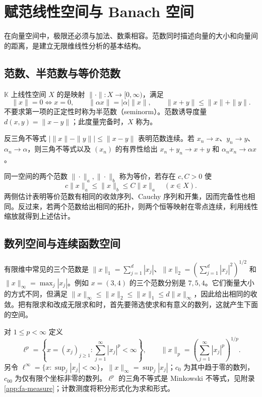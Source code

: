 \documentclass[UTF8,12pt,a4paper,fontset=fandol]{ctexbook}
\begin{document}
\chapter{赋范线性空间与 Banach 空间}
\label{chap:fa-banach}

在向量空间中，极限还必须与加法、数乘相容。范数同时描述向量的大小和向量间的距离，是建立无限维线性分析的基本结构。

\section{范数、半范数与等价范数}
\begin{definition}
$\mathbb K$ 上线性空间 $X$ 的是映射 $\|\cdot\|:X\to[0,\infty)$，满足
\[
 \|x\|=0\iff x=0,\qquad \|\alpha x\|=|\alpha|\|x\|,\qquad
 \|x+y\|\leq\|x\|+\|y\|.
\]
不要求第一项的正定性时称为半范数（seminorm）。范数诱导度量 $d(x,y)=\|x-y\|$；此度量完备时，$X$ 称为。
\end{definition}
反三角不等式 $|\|x\|-\|y\||\leq\|x-y\|$ 表明范数连续。若 $x_n\to x$、$y_n\to y$、$\alpha_n\to\alpha$，则三角不等式以及 $(x_n)$ 的有界性给出 $x_n+y_n\to x+y$ 和 $\alpha_nx_n\to\alpha x$。

同一空间的两个范数 $\|\cdot\|_a,\|\cdot\|_b$ 称为等价，若存在 $c,C>0$ 使
\[
 c\|x\|_a\leq\|x\|_b\leq C\|x\|_a\quad(x\in X).
\]
两侧估计表明等价范数有相同的收敛序列、Cauchy 序列和开集，因而完备性也相同。反过来，若两个范数给出相同的拓扑，则两个恒等映射在零点连续，利用线性缩放就得到上述估计。

\section{数列空间与连续函数空间}
有限维中常见的三个范数是 $\|x\|_1=\sum_{j=1}^d|x_j|$、$\|x\|_2=(\sum_{j=1}^d|x_j|^2)^{1/2}$ 和 $\|x\|_\infty=\max_j|x_j|$。例如 $x=(3,4)$ 的三个范数分别是 $7,5,4$。它们衡量大小的方式不同，但满足 $\|x\|_\infty\leq\|x\|_2\leq\|x\|_1\leq d\|x\|_\infty$，因此给出相同的收敛。把有限求和改成无限求和时，首先要筛选使求和有意义的数列，这就产生下面的空间。

对 $1\leq p<\infty$ 定义
\[
 \ell^p=\left\{x=(x_j)_{j\geq1}:\sum_{j=1}^\infty|x_j|^p<\infty\right\},
 \qquad \|x\|_p=\left(\sum_{j=1}^\infty|x_j|^p\right)^{1/p}.
\]
另令 $\ell^\infty=\{x:\sup_j|x_j|<\infty\}$，$\|x\|_\infty=\sup_j|x_j|$；$c_0$ 为其中趋于零的数列，$c_{00}$ 为仅有限个坐标非零的数列。$\ell^p$ 的三角不等式是 Minkowski 不等式，见附录\ref{app:fa-measure}；计数测度将积分形式化为求和形式。
\end{document}
